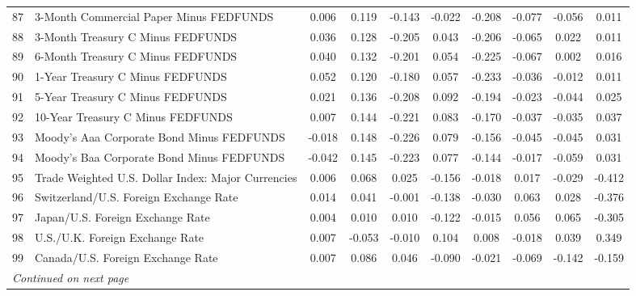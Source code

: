 \begin{table}[!h]
\begin{tabular}{llcccccccc}
87&3-Month Commercial Paper Minus FEDFUNDS	&	0.006	&	0.119	&	-0.143	&	-0.022	&	-0.208	&	-0.077	&	-0.056	&	0.011	\\
88&3-Month Treasury C Minus FEDFUNDS	&	0.036	&	0.128	&	-0.205	&	0.043	&	-0.206	&	-0.065	&	0.022	&	0.011	\\
89&6-Month Treasury C Minus FEDFUNDS	&	0.040	&	0.132	&	-0.201	&	0.054	&	-0.225	&	-0.067	&	0.002	&	0.016	\\
90&1-Year Treasury C Minus FEDFUNDS	&	0.052	&	0.120	&	-0.180	&	0.057	&	-0.233	&	-0.036	&	-0.012	&	0.011	\\
91&5-Year Treasury C Minus FEDFUNDS	&	0.021	&	0.136	&	-0.208	&	0.092	&	-0.194	&	-0.023	&	-0.044	&	0.025	\\
92&10-Year Treasury C Minus FEDFUNDS	&	0.007	&	0.144	&	-0.221	&	0.083	&	-0.170	&	-0.037	&	-0.035	&	0.037	\\
93&Moody’s Aaa Corporate Bond Minus FEDFUNDS	&	-0.018	&	0.148	&	-0.226	&	0.079	&	-0.156	&	-0.045	&	-0.045	&	0.031	\\
94&Moody’s Baa Corporate Bond Minus FEDFUNDS	&	-0.042	&	0.145	&	-0.223	&	0.077	&	-0.144	&	-0.017	&	-0.059	&	0.031	\\
95&Trade Weighted U.S. Dollar Index: Major Currencies	&	0.006	&	0.068	&	0.025	&	-0.156	&	-0.018	&	0.017	&	-0.029	&	-0.412	\\
96&Switzerland/U.S. Foreign Exchange Rate	&	0.014	&	0.041	&	-0.001	&	-0.138	&	-0.030	&	0.063	&	0.028	&	-0.376	\\
97&Japan/U.S. Foreign Exchange Rate	&	0.004	&	0.010	&	0.010	&	-0.122	&	-0.015	&	0.056	&	0.065	&	-0.305	\\
98&U.S./U.K. Foreign Exchange Rate	&	0.007	&	-0.053	&	-0.010	&	0.104	&	0.008	&	-0.018	&	0.039	&	0.349	\\
99&Canada/U.S. Foreign Exchange Rate	&	0.007	&	0.086	&	0.046	&	-0.090	&	-0.021	&	-0.069	&	-0.142	&	-0.159	\\
 \hline
\multicolumn{10}{l}{\it Continued on next page}
    \end{tabular}
    \label{macro_loadings2}
\end{table}

